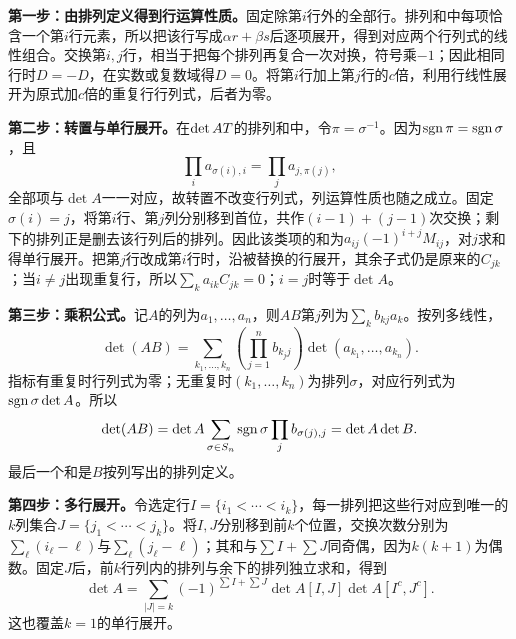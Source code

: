 \label{der:1-1}
\textbf{第一步：由排列定义得到行运算性质。}固定除第$i$行外的全部行。排列和中每项恰含一个第$i$行元素，所以把该行写成$\alpha r+\beta s$后逐项展开，得到对应两个行列式的线性组合。交换第$i,j$行，相当于把每个排列再复合一次对换，符号乘$-1$；因此相同行时$D=-D$，在实数或复数域得$D=0$。将第$i$行加上第$j$行的$c$倍，利用行线性展开为原式加$c$倍的重复行行列式，后者为零。

\textbf{第二步：转置与单行展开。}在$\det AT$的排列和中，令$\pi=\sigma^{-1}$。因为$\operatorname{sgn}\pi=\operatorname{sgn}\sigma$，且
\[\prod_i a_{\sigma(i),i}=\prod_j a_{j,\pi(j)},\]
全部项与$\det A$一一对应，故转置不改变行列式，列运算性质也随之成立。固定$\sigma(i)=j$，将第$i$行、第$j$列分别移到首位，共作$(i-1)+(j-1)$次交换；剩下的排列正是删去该行列后的排列。因此该类项的和为$a_{ij}(-1)^{i+j}M_{ij}$，对$j$求和得单行展开。把第$j$行改成第$i$行时，沿被替换的行展开，其余子式仍是原来的$C_{jk}$；当$i\ne j$出现重复行，所以$\sum_k a_{ik}C_{jk}=0$；$i=j$时等于$\det A$。

\textbf{第三步：乘积公式。}记$A$的列为$a_1,\ldots,a_n$，则$AB$第$j$列为$\sum_k b_{kj}a_k$。按列多线性，
\[\det(AB)=\sum_{k_1,\ldots,k_n}\left(\prod_{j=1}^n b_{k_jj}\right)\det(a_{k_1},\ldots,a_{k_n}).\]
指标有重复时行列式为零；无重复时$(k_1,\ldots,k_n)$为排列$\sigma$，对应行列式为$\operatorname{sgn}\sigma\det A$。所以
\[\det(AB)=\det A\sum_{\sigma\in S_n}\operatorname{sgn}\sigma\prod_j b_{\sigma(j),j}=\det A\det B.\]
最后一个和是$B$按列写出的排列定义。

\textbf{第四步：多行展开。}令选定行$I=\{i_1<\cdots<i_k\}$，每一排列把这些行对应到唯一的$k$列集合$J=\{j_1<\cdots<j_k\}$。将$I,J$分别移到前$k$个位置，交换次数分别为$\sum_{\ell}(i_\ell-\ell)$与$\sum_{\ell}(j_\ell-\ell)$；其和与$\sum I+\sum J$同奇偶，因为$k(k+1)$为偶数。固定$J$后，前$k$行列内的排列与余下的排列独立求和，得到
\[\det A=\sum_{|J|=k}(-1)^{\sum I+\sum J}\det A[I,J]\det A[I^c,J^c].\]
这也覆盖$k=1$的单行展开。
